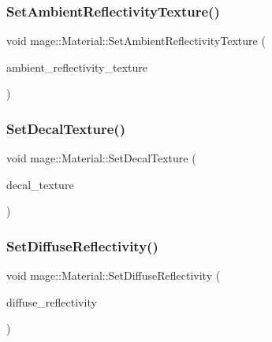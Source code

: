 \hypertarget{structmage_1_1_material_a220430d91bcc02a78a8e1601d7725417}{}\label{structmage_1_1_material_a220430d91bcc02a78a8e1601d7725417} 
\subsubsection{\texorpdfstring{Set\+Ambient\+Reflectivity\+Texture()}{SetAmbientReflectivityTexture()}}
{\footnotesize\ttfamily void mage\+::\+Material\+::\+Set\+Ambient\+Reflectivity\+Texture (\begin{DoxyParamCaption}\item[{\hyperlink{namespacemage_a1e01ae66713838a7a67d30e44c67703e}{Shared\+Ptr}$<$ \hyperlink{classmage_1_1_texture}{Texture} $>$}]{ambient\+\_\+reflectivity\+\_\+texture }\end{DoxyParamCaption})}

\hypertarget{structmage_1_1_material_ad52bf9c9d802fce7f7ec47f35a44d180}{}\label{structmage_1_1_material_ad52bf9c9d802fce7f7ec47f35a44d180} 
\subsubsection{\texorpdfstring{Set\+Decal\+Texture()}{SetDecalTexture()}}
{\footnotesize\ttfamily void mage\+::\+Material\+::\+Set\+Decal\+Texture (\begin{DoxyParamCaption}\item[{\hyperlink{namespacemage_a1e01ae66713838a7a67d30e44c67703e}{Shared\+Ptr}$<$ \hyperlink{classmage_1_1_texture}{Texture} $>$}]{decal\+\_\+texture }\end{DoxyParamCaption})}

\hypertarget{structmage_1_1_material_aef82ef4eba08eabc31989144316a57c6}{}\label{structmage_1_1_material_aef82ef4eba08eabc31989144316a57c6} 
\subsubsection{\texorpdfstring{Set\+Diffuse\+Reflectivity()}{SetDiffuseReflectivity()}\hspace{0.1cm}{\footnotesize\ttfamily [1/2]}}
{\footnotesize\ttfamily void mage\+::\+Material\+::\+Set\+Diffuse\+Reflectivity (\begin{DoxyParamCaption}\item[{const \hyperlink{structmage_1_1_r_g_b_spectrum}{R\+G\+B\+Spectrum} \&}]{diffuse\+\_\+reflectivity }\end{DoxyParamCaption})\hspace{0.3cm}{\ttfamily [noexcept]}}

